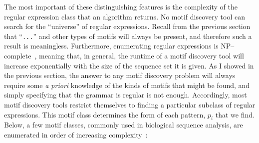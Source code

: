         

            The most important of these distinguishing features
            is the complexity of the regular expression class that
            an algorithm returns.  No motif discovery tool can
            search for the ``universe'' of regular expressions.
            Recall from the previous section that ``\texttt{...}''
            and other types of motifs will always be present, and
            therefore such a result is meaningless.  Furthermore,
            enumerating regular expressions is
            NP--complete~\cite{maier1978complexity,garey1979computers},
            meaning that, in general, the runtime of a motif
            discovery tool will increase exponentially with the size
            of the sequence set it is given.  As I showed in the
            previous section, the answer to any motif discovery
            problem will always require some \emph{a priori}
            knowledge of the kinds of motifs that might be found, and
            simply specifying that the grammar is regular is not
            enough.  Accordingly, most motif discovery tools
            restrict themselves to finding a particular subclass of
            regular expressions.
            This motif class determines the form of each
            pattern, $p_i$ that we find.  Below, a few motif classes, commonly
            used in biological sequence analysis,  are enumerated in
            order of increasing complexity~\cite{floratos1999pattern}:

